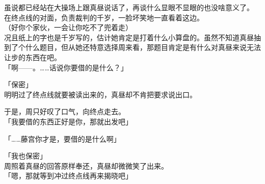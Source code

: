虽说都已经站在大操场上跟真昼说话了，再谈什么显眼不显眼的也没啥意义了。\\

在终点线的对面，负责裁判的千岁，一脸坏笑地一直看着这边。\\

（好你个家伙，一会让你吃不了兜着走）\\

况且纸上的字也是千岁写的，估计她肯定是打着什么小算盘的。虽然不知道真昼抽到了个什么题目，但从她还特意选择周来看，那题目肯定是有什么对真昼来说无法让步的东西在吧。\\

「啊——。……话说你要借的是什么？」

「保密」\\

明明过了终点线就要被读出来的，真昼却不肯把要求说出口。

于是，周只好叹了口气，向终点走去。\\

「我要借的东西正好是你，那就出发吧」

「……藤宫你才是，要借的是什么啊」

「我也保密」\\

周照着真昼的回答原样奉还，真昼却微微笑了出来。\\

「嗯，那就等到冲过终点线再来揭晓吧」\\

